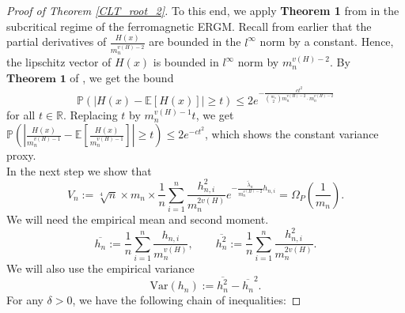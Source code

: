 \documentclass[12pt]{article}
\numberwithin{equation}{section}
\begin{document}
\begin{proof}[Proof of Theorem \ref{CLT_root_2}]
    
    To this end, we apply \textbf{Theorem 1} from \cite{ganguly2024sub} in the subcritical regime of the ferromagnetic ERGM. Recall from earlier that the partial derivatives of \(\frac{H(x)}{m_n^{v(H)-2}}\) are bounded in the \(l^{\infty}\) norm by a constant. Hence, the lipschitz vector of \(H(x)\) is bounded in \(l^{\infty}\) norm by \(m_n^{v(H)-2}\). By \(\textbf{Theorem 1}\) of \cite{ganguly2024sub}, we get the bound
    \[
    \mathbb{P}(\left\lvert H(x) - \mathbb{E}[H(x)]\right\rvert\geq t)\leq 2e^{-\frac{ct^2}{{m_n\choose 2}m_n^{v(H)-2}\cdot m_n^{v(H)-2}}}
    \]
    for all \(t\in\mathbb{R}\). Replacing \(t\) by \(m_n^{v(H)-1}t\), we get
    \(\mathbb{P}\left(\left\lvert\frac{H(x)}{m_n^{v(H)-1}}-\mathbb{E}\left[\frac{H(x)}{m_n^{v(H)-1}}\right]\right\rvert\geq t\right)\leq 2e^{-ct^2}\), which shows the constant variance proxy.\\
    
 In the next step we show that 
 \begin{equation}V_n:= \sqrt[4]{n}\times m_n\times\frac{1}{n} \sum_{i=1}^{n} \frac{h_{n,i}^2}{m_n^{2v(H)}}e^{-\frac{\tilde{\lambda}_n}{m_n^{v(H)-2}}h_{n,i}} = \Omega_P\left(\frac{1}{m_n}\right).\label{denom_bound}\end{equation}
We will need the empirical mean and second moment.
\[
\overline{h_n}:=\frac{1}{n}\sum_{i=1}^n\frac{h_{n,i}}{m_n^{v(H)}},\qquad
\overline{h_n^2}:=\frac{1}{n}\sum_{i=1}^n\frac{h_{n,i}^2}{m_n^{2v(H)}}.
\]
We will also use the empirical variance
\[
\widehat{\mathrm{Var}}(h_n):=\overline{h_n^2}-\overline{h_n}^2.
\]
For any \(\delta>0\), we have the following chain of inequalities:


\end{proof}
\end{document}
